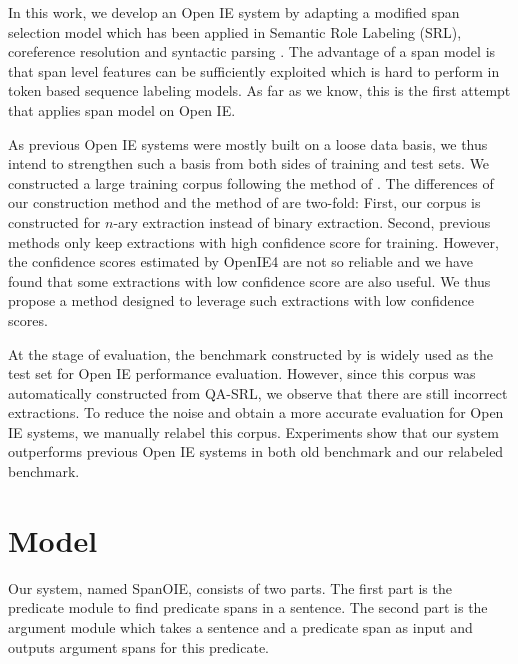\documentclass[letterpaper]{article} \usepackage{aaai20}  \usepackage{times}  \usepackage{helvet} \usepackage{courier}  \usepackage[hyphens]{url}  \urlstyle{rm} \def\UrlFont{\rm}  \usepackage{graphicx}  \frenchspacing  \setlength{\pdfpagewidth}{8.5in}  \setlength{\pdfpageheight}{11in}
\begin{document}
In this work, we develop an Open IE system by adapting a modified span selection model which has been applied in Semantic Role Labeling (SRL)\cite{Ouchi2018ASS,he-etal-2018-syntax,Li2019DependencyOS,Zhao2013IntegrativeSD,zhao-etal-2009-semantic,li-etal-2018-unified,cai2018full}, coreference resolution\cite{shou-zhao-2012-system,zhang-etal-2012-chinese} and syntactic parsing \cite{zhang-etal-2016-probabilistic,ma-zhao-2012-fourth,Li2020GlobalGreedy,zhou-zhao-2019-head,zhao-etal-2009-cross,li-etal-2018-seq2seq}. The advantage of a span model is that span level features can be sufficiently exploited which is hard to perform in token based sequence labeling models. As far as we know, this is the first attempt that applies span model on Open IE. 

As previous Open IE systems were mostly built on a loose data basis, we thus intend to strengthen such a basis from both sides of training and test sets. We constructed a large training corpus following the method of \cite{Cui2018NeuralOI}. The differences of our construction method and the method of \cite{Cui2018NeuralOI} are two-fold: First, our corpus is constructed for $n$-ary extraction instead of binary extraction. Second, previous methods only keep extractions with high confidence score for training. However, the confidence scores estimated by OpenIE4 are not so reliable and we have found that some extractions with low confidence score are also useful. We thus propose a method designed to leverage such extractions with low confidence scores.

At the stage of evaluation, the benchmark constructed by \cite{Stanovsky2016CreatingAL} is widely used as the test set for Open IE performance evaluation. However, since this corpus was automatically constructed from QA-SRL, we observe that there are still incorrect extractions. To reduce the noise and obtain a more accurate evaluation for Open IE systems, we manually relabel this corpus. Experiments show that our system outperforms previous Open IE systems in both old benchmark and our relabeled benchmark. 

\section{Model}
Our system, named SpanOIE, consists of two parts. The first part is the predicate module to find predicate spans in a sentence. The second part is the argument module which takes a sentence and a predicate span as input and outputs argument spans for this predicate. 
\end{document}
